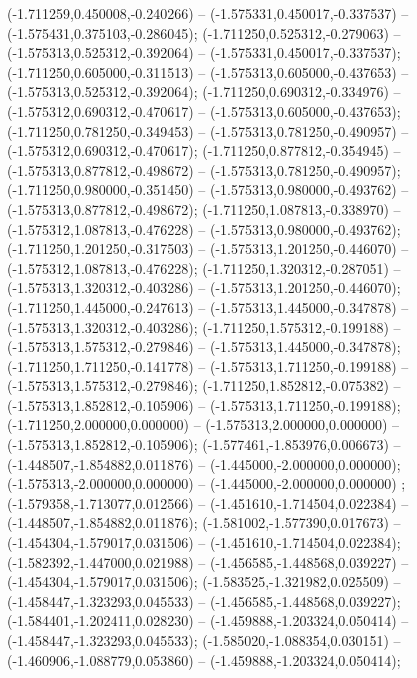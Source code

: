  (-1.711259,0.450008,-0.240266) -- (-1.575331,0.450017,-0.337537) -- (-1.575431,0.375103,-0.286045);
 (-1.711250,0.525312,-0.279063) -- (-1.575313,0.525312,-0.392064) -- (-1.575331,0.450017,-0.337537);
 (-1.711250,0.605000,-0.311513) -- (-1.575313,0.605000,-0.437653) -- (-1.575313,0.525312,-0.392064);
 (-1.711250,0.690312,-0.334976) -- (-1.575312,0.690312,-0.470617) -- (-1.575313,0.605000,-0.437653);
 (-1.711250,0.781250,-0.349453) -- (-1.575313,0.781250,-0.490957) -- (-1.575312,0.690312,-0.470617);
 (-1.711250,0.877812,-0.354945) -- (-1.575313,0.877812,-0.498672) -- (-1.575313,0.781250,-0.490957);
 (-1.711250,0.980000,-0.351450) -- (-1.575313,0.980000,-0.493762) -- (-1.575313,0.877812,-0.498672);
 (-1.711250,1.087813,-0.338970) -- (-1.575312,1.087813,-0.476228) -- (-1.575313,0.980000,-0.493762);
 (-1.711250,1.201250,-0.317503) -- (-1.575313,1.201250,-0.446070) -- (-1.575312,1.087813,-0.476228);
 (-1.711250,1.320312,-0.287051) -- (-1.575313,1.320312,-0.403286) -- (-1.575313,1.201250,-0.446070);
 (-1.711250,1.445000,-0.247613) -- (-1.575313,1.445000,-0.347878) -- (-1.575313,1.320312,-0.403286);
 (-1.711250,1.575312,-0.199188) -- (-1.575313,1.575312,-0.279846) -- (-1.575313,1.445000,-0.347878);
 (-1.711250,1.711250,-0.141778) -- (-1.575313,1.711250,-0.199188) -- (-1.575313,1.575312,-0.279846);
 (-1.711250,1.852812,-0.075382) -- (-1.575313,1.852812,-0.105906) -- (-1.575313,1.711250,-0.199188);
 (-1.711250,2.000000,0.000000) -- (-1.575313,2.000000,0.000000) -- (-1.575313,1.852812,-0.105906);
 (-1.577461,-1.853976,0.006673) -- (-1.448507,-1.854882,0.011876) -- (-1.445000,-2.000000,0.000000);
 (-1.575313,-2.000000,0.000000) -- (-1.445000,-2.000000,0.000000) ;
 (-1.579358,-1.713077,0.012566) -- (-1.451610,-1.714504,0.022384) -- (-1.448507,-1.854882,0.011876);
 (-1.581002,-1.577390,0.017673) -- (-1.454304,-1.579017,0.031506) -- (-1.451610,-1.714504,0.022384);
 (-1.582392,-1.447000,0.021988) -- (-1.456585,-1.448568,0.039227) -- (-1.454304,-1.579017,0.031506);
 (-1.583525,-1.321982,0.025509) -- (-1.458447,-1.323293,0.045533) -- (-1.456585,-1.448568,0.039227);
 (-1.584401,-1.202411,0.028230) -- (-1.459888,-1.203324,0.050414) -- (-1.458447,-1.323293,0.045533);
 (-1.585020,-1.088354,0.030151) -- (-1.460906,-1.088779,0.053860) -- (-1.459888,-1.203324,0.050414);
